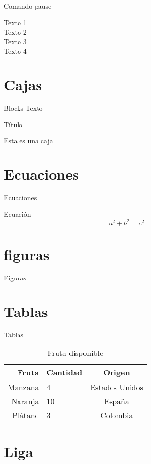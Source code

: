 \documentclass[11pt]{beamer}
\begin{document}
\begin{frame}{Comando pause}

Texto 1\\ \pause
Texto 2 \\ \pause
Texto 3\\
Texto 4 \\
\end{frame}


\section{Cajas}

\begin{frame}{Blocks}
Texto
\begin{block}{Título}
\begin{center}
Esta es una caja
\end{center}
\end{block}
\end{frame}

\section{Ecuaciones}

\begin{frame}{Ecuaciones}
\begin{block}{Ecuación}
$$a^2 +b^2 =c^2$$
\end{block}
\end{frame}

\section{figuras}

\begin{frame}{Figuras}
\end{frame}

\section{Tablas}
\begin{frame}{Tablas}
\begin{table}[t]
\begin{center}
\begin{tabular}{| r | l | c |}
\hline
Fruta & Cantidad & Origen \\ \hline
Manzana & 4 & Estados Unidos \\
Naranja & 10 & España \\
Plátano & 3 & Colombia \\ \hline
\end{tabular}
\caption{Fruta disponible}
\label{tab:fruta}
\end{center}
\end{table}
\end{frame}


\section{Liga}
\end{document}
